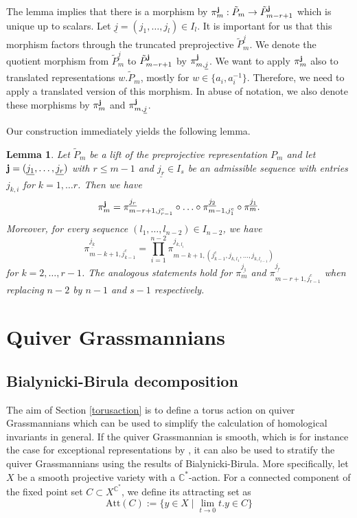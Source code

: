 \documentclass{amsart}
\newtheorem{lemma}[theorem]{Lemma}
\newcommand{\C}{\mathbb{C}}
\newcommand{\uj}{\underline j}
\begin{document}
The lemma implies that there is a morphism by $\pi_m^{\bf j}:\tilde P_m\to \tilde P_{m-r+1}^{\bf j}$ which is unique up to scalars. Let $\uj=(j_{1},\ldots,j_{l})\in I_l$. It is important for us that this morphism factors through the truncated preprojective $\tilde P_m^{\uj}$. We denote the quotient morphism from $\tilde P_m^{\uj}$ to $\tilde P_{m-r+1}^{\bf j}$ by $\pi_{m,\uj}^{\bf j}$. We want to apply $\pi_m^{\bf j}$ also to translated representations $w.\tilde P_m$, mostly for $w\in\{a_i,a_i^{-1}\}$. Therefore, we need to apply a translated version of this morphism. In abuse of notation, we also denote these morphisms by $\pi_m^{\bf j}$ and $\pi_{m,\uj}^{\bf j}$.

Our construction immediately yields the following lemma.
\begin{lemma}\label{projections}
Let $\tilde P_m$ be a lift of the preprojective representation $P_m$ and let ${\bf j}=(\underline{j_1},\ldots,\underline{j_r})$ with $r\leq m-1$ and $\underline{j_r}\in I_s$ be an admissible sequence with entries $j_{k,i}$ for $k=1,\ldots r$. Then we have
\[\pi_m^{\bf j}=\pi_{m-r+1,j_{r-1}^c}^{\underline{j_r}}\circ\ldots\circ\pi^{\underline{j_2}}_{m-1,j_1^c}\circ\pi_m^{\underline{j_1}}.\]
Moreover, for every sequence $(l_1,\ldots,l_{n-2})\in I_{n-2}$, we have
\[\pi_{m-k+1,j_{k-1}^c}^{\underline{j_k}}=\prod_{i=1}^{n-2} \pi^{j_{k,l_{i}}}_{m-k+1,(j_{k-1}^c,j_{k,l_1},\ldots,j_{k,l_{i-1}})}\]
for $k=2,\ldots,r-1$. The analogous statements hold for $\pi_m^{\underline{j_1}}$ and  $\pi_{m-r+1,j_{r-1}^c}^{\underline{j_r}}$ when replacing $n-2$ by $n-1$ and $s-1$ respectively.
\end{lemma}

\section{Quiver Grassmannians}
\label{QG}

\subsection{Bialynicki-Birula decomposition}
The aim of Section \ref{torusaction} is to define a torus action on quiver Grassmannians which can be used to simplify the calculation of homological invariants in general.
If the quiver Grassmannian is smooth, which is for instance the case for exceptional representations by \cite{cr}, it can also be used to stratify the quiver Grassmannians using the results of Bialynicki-Birula.
More specifically, let $X$ be a smooth projective variety with a $\C^\ast$-action.
For a connected component of the fixed point set $C\subset X^{\C^\ast}$, we define its attracting set as
\[
  \mathrm{Att}(C):=\{y\in X\mid \lim_{t\to 0}t.y\in C\}
\]
\end{document}
